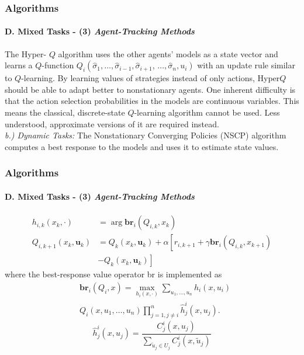 \documentclass{beamer}
\begin{document}
\begin{frame}
\frametitle{Algorithms}
\framesubtitle{D. Mixed Tasks - (3) \textit{Agent-Tracking Methods}}
The Hyper- $Q$ algorithm uses the other agents' models as a state vector and learns a $Q$-function $Q_i\left(\hat{\sigma}_1, \ldots, \hat{\sigma}_{i-1}, \hat{\sigma}_{i+1}\right.$, $\left.\ldots, \hat{\sigma}_n, u_i\right)$ with an update rule similar to $Q$-learning. By learning values of strategies instead of only actions, Hyper$Q$ should be able to adapt better to nonstationary agents. One inherent difficulty is that the action selection probabilities in the models are continuous variables. This means the classical,
discrete-state $Q$-learning algorithm cannot be used. Less understood, approximate versions of it are required instead.\\
\textit{b.) Dynamic Tasks:} The Nonstationary Converging Policies
(NSCP) algorithm computes a best response to the models
and uses it to estimate state values.
\end{frame}

\begin{frame}
\frametitle{Algorithms}
\framesubtitle{D. Mixed Tasks - (3) \textit{Agent-Tracking Methods}}
$$
\begin{aligned}
h_{i, k}\left(x_k, \cdot\right) & =\arg \mathbf{b r}_i\left(Q_{i, k}, x_k\right) \\
Q_{i, k+1}\left(x_k, \boldsymbol{u}_k\right) & =Q_k\left(x_k, \boldsymbol{u}_k\right)+\alpha\left[r_{i, k+1}+\gamma \mathbf{b r}_i\left(Q_{i, k}, x_{k+1}\right)\right. \\
& \left.-Q_k\left(x_k, \boldsymbol{u}_k\right)\right]
\end{aligned}
$$
where the best-response value operator br is implemented as
$$
\begin{aligned}
& \mathbf{b r}_i\left(Q_i, x\right)=\max _{h_i(x, \cdot)} \sum_{u_1, \ldots, u_n} h_i\left(x, u_i\right) \\
& Q_i\left(x, u_1, \ldots, u_n\right) \prod_{j=1, j \neq i}^n \hat{h}_j^i\left(x, u_j\right) .
\end{aligned}
$$
$$\hat{h}_j^i\left(x, u_j\right)=\frac{C_j^i\left(x, u_j\right)}{\sum_{\tilde{u}_j \in U_j} C_j^i\left(x, \tilde{u}_j\right)}$$
\end{frame}
\end{document}
